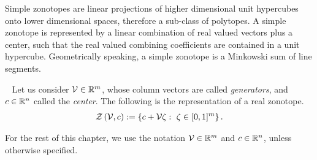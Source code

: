 Simple zonotopes are linear
projections of higher dimensional unit hypercubes onto lower
dimensional spaces, therefore a sub-class of polytopes.  A simple
zonotope is represented by a linear combination of real valued vectors
plus a center, such that the real valued combining coefficients are
contained in a unit hypercube.  Geometrically speaking, a simple
zonotope is a Minkowski sum of line segments.
%
\begin{definition}~\label{defn:rztope}
Let us consider $\mathcal{V}\in\mathbb{R}^m$, whose column vectors are called
\emph{generators}, and $c\in\mathbb{R}^n$ called the \emph{center}.  The following is the
representation of a real zonotope.
%
\begin{align*}
\mathit{\mathcal{Z}}\left(\mathcal{V},c\right):=\left\{c+\mathcal{V}\zeta:~\zeta\in[0,1]^m\right\}.
\end{align*}
%
\end{definition}
%
For the rest of this chapter, we
use the notation $\mathcal{V}\in\mathbb{R}^m$ and $c\in\mathbb{R}^n$, unless
otherwise specified.

